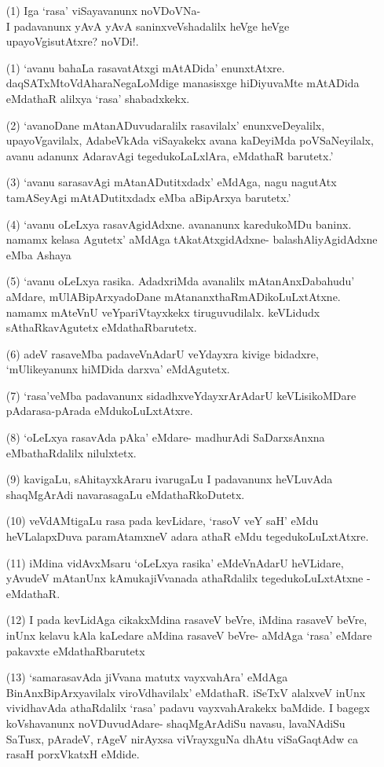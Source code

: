 \begin{itemize}
\item[(1)] Iga `rasa' viSayavanunx noVDoVNa-\\
I padavanunx yAvA yAvA saninxveVshadalilx heVge heVge upayoVgisutAtxre? noVDi!.
\item[(1)] `avanu bahaLa rasavatAtxgi mAtADida' enunxtAtxre. daqSATxMtoVdAharaNegaLoMdige manasisxge hiDiyuvaMte mAtADida eMdathaR alilxya `rasa' shabadxkekx.
\item[(2)] `avanoDane mAtanADuvudaralilx rasavilalx' enunxveDeyalilx, upayoVgavilalx, AdabeVkAda viSayakekx avana kaDeyiMda poVSaNeyilalx, avanu adanunx AdaravAgi tegedukoLaLxlAra, eMdathaR barutetx.'
\item[(3)] `avanu sarasavAgi mAtanADutitxdadx' eMdAga, nagu nagutAtx tamASeyAgi mAtADutitxdadx eMba aBipArxya barutetx.'
\item[(4)] `avanu oLeLxya rasavAgidAdxne. avananunx karedukoMDu baninx. namamx kelasa Agutetx' aMdAga tAkatAtxgidAdxne- balashAliyAgidAdxne eMba Ashaya
\item[(5)] `avanu oLeLxya rasika. AdadxriMda avanalilx mAtanAnxDabahudu' aMdare, mUlABipArxyadoDane mAtananxthaRmADikoLuLxtAtxne. namamx mAteVnU veYpariVtayxkekx tiruguvudilalx. keVLidudx sAthaRkavAgutetx eMdathaRbarutetx.
\item[(6)] adeV rasaveMba padaveVnAdarU veYdayxra kivige bidadxre, `mUlikeyanunx hiMDida darxva' eMdAgutetx.
\item[(7)] `rasa'veMba padavanunx sidadhxveYdayxrArAdarU keVLisikoMDare pAdarasa-pArada eMdukoLuLxtAtxre.
\item[(8)] `oLeLxya rasavAda pAka' eMdare- madhurAdi SaDarxsAnxna eMbathaRdalilx nilulxtetx.
\item[(9)] kavigaLu, sAhitayxkAraru ivarugaLu I padavanunx heVLuvAda shaqMgArAdi navarasagaLu eMdathaRkoDutetx.
\item[(10)] veVdAMtigaLu rasa pada kevLidare, `rasoV veY saH' eMdu heVLalapxDuva paramAtamxneV adara athaR eMdu tegedukoLuLxtAtxre.
\item[(11)] iMdina vidAvxMsaru `oLeLxya rasika' eMdeVnAdarU heVLidare, yAvudeV mAtanUnx kAmukajiVvanada athaRdalilx tegedukoLuLxtAtxne - eMdathaR.
\item[(12)] I pada kevLidAga cikakxMdina rasaveV beVre, iMdina rasaveV beVre, inUnx kelavu kAla kaLedare aMdina rasaveV beVre- aMdAga `rasa' eMdare pakavxte eMdathaRbarutetx
\item[(13)] `samarasavAda jiVvana matutx vayxvahAra' eMdAga BinAnxBipArxyavilalx viroVdhavilalx' eMdathaR. iSeTxV alalxveV inUnx vividhavAda athaRdalilx `rasa' padavu vayxvahArakekx baMdide. I bagegx koVshavanunx noVDuvudAdare- shaqMgArAdiSu navasu, lavaNAdiSu SaTusx, pAradeV, rAgeV nirAyxsa viVrayxguNa dhAtu viSaGaqtAdw ca rasaH porxVkatxH eMdide.
\end{itemize}

